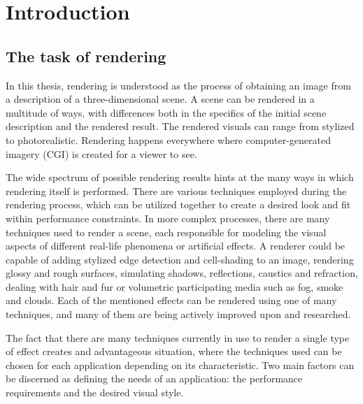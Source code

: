 \chapter{Introduction}

\section{The task of rendering}

In this thesis, rendering is understood as the process of obtaining an image from a description of a three-dimensional scene. A scene can be rendered in a multitude of ways, with differences both in the specifics of the initial scene description and the rendered result. The rendered visuals can range from stylized to photorealistic. Rendering happens everywhere where computer-generated imagery (CGI) is created for a viewer to see.

The wide spectrum of possible rendering results hints at the many ways in which rendering itself is performed. There are various techniques employed during the rendering process, which can be utilized together to create a desired look and fit within performance constraints. In more complex processes, there are many techniques used to render a scene, each responsible for modeling the visual aspects of different real-life phenomena or artificial effects. A renderer could be capable of adding stylized edge detection and cell-shading to an image, rendering glossy and rough surfaces, simulating shadows, reflections, caustics and refraction, dealing with hair and fur or volumetric participating media such as fog, smoke and clouds. Each of the mentioned effects can be rendered using one of many techniques, and many of them are being actively improved upon and researched.

The fact that there are many techniques currently in use to render a single type of effect creates and advantageous situation, where the techniques used can be chosen for each application depending on its characteristic. Two main factors can be discerned as defining the needs of an application: the performance requirements and the desired visual style.

